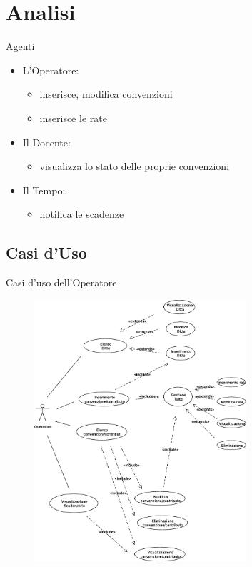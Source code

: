 \section{Analisi}
  \begin{frame}{Agenti}
    
    \begin{itemize}
     \item L'Operatore:\\
      \begin{itemize}
       \item inserisce, modifica convenzioni
       \item inserisce le rate
      \end{itemize}

     \item Il Docente:\\
      \begin{itemize}
       \item visualizza lo stato delle proprie convenzioni
      \end{itemize}

     \item Il Tempo:\\
      \begin{itemize}
       \item notifica le scadenze
      \end{itemize}

    \end{itemize}

    
  \end{frame}

  \subsection{Casi d'Uso}
  \begin{frame}{Casi d'uso dell'Operatore}
    \begin{figure}[h]
    \label{use_case_diag_operator}
    \centering
    \includegraphics[height=0.8\textheight, width=0.7\textwidth]{images/casi_uso_operatore.eps}
    \end{figure}
  \end{frame}
  
